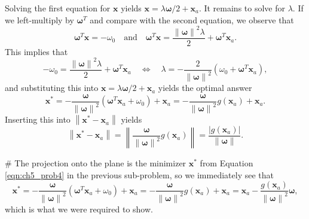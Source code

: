 \documentclass[12pt, a4paper]{article}
\newcommand{\vect}[1]{\bm{#1}}
\newcommand{\norm}[1]{\left\lVert#1\right\rVert}
\newcommand{\abs}[1]{\left\lvert#1\right\rvert}
\begin{document}
\begin{easylist}[enumerate]
	Solving the first equation for $\vect{x}$ yields $\vect{x} = \lambda \vect{\omega} / 2 + \vect{x}_a$.
	It remains to solve for $\lambda$.
	If we left-multiply by $\vect{\omega}^T$ and compare with the second equation, we observe that
	\begin{equation*}
		\vect{\omega}^T \vect{x} 
		= -\omega_0 \quad \text{and} 
		\quad 
		\vect{\omega}^T \vect{x} 
		= 
		\frac{\norm{\vect{\omega}}^2 \lambda}{2} + \vect{\omega}^T \vect{x}_a.
	\end{equation*}
	This implies that
	\begin{equation*}
		-\omega_0 =  \frac{\norm{\vect{\omega}}^2 \lambda}{2} + \vect{\omega}^T \vect{x}_a \quad \Leftrightarrow \quad \lambda = - \frac{2}{\norm{\vect{\omega}}^2}\left( \omega_0 + \vect{\omega}^T \vect{x}_a \right),
	\end{equation*}
	and substituting this into $\vect{x} = \lambda \vect{\omega} / 2 + \vect{x}_a$ yields the optimal answer
	\begin{equation}
	\label{eqn:ch5_prob4}
		\vect{x}^* = -\frac{\vect{\omega}}{\norm{\vect{\omega}}^2} \left( \vect{\omega}^T \vect{x}_a + \omega_0 \right) + \vect{x}_a = - \frac{\vect{\omega}}{\norm{\vect{\omega}}^2} g(\vect{x}_a) + \vect{x}_a.
	\end{equation}
	Inserting this into $\norm{\vect{x}^* - \vect{x}_a}$ yields 
	\begin{equation*}
		\norm{\vect{x}^* - \vect{x}_a}=
		\norm{\frac{\vect{\omega}}{\norm{\vect{\omega}}^2} g(\vect{x}_a)}
		= \frac{\abs{g(\vect{x}_a)}}{\norm{\vect{\omega}}}.
	\end{equation*}
	
	# The projection onto the plane is the minimizer $\vect{x}^*$ from Equation \eqref{eqn:ch5_prob4} in the previous sub-problem, so we immediately see that 
	\begin{equation*}
	\vect{x}^* = -\frac{\vect{\omega}}{\norm{\vect{\omega}}^2} \left( \vect{\omega}^T \vect{x}_a + \omega_0 \right) + \vect{x}_a = - \frac{\vect{\omega}}{\norm{\vect{\omega}}^2} g(\vect{x}_a) + \vect{x}_a
	=  
	\vect{x}_a - \frac{g(\vect{x}_a)}{\norm{\vect{\omega}}^2}  \vect{\omega},
	\end{equation*}
	which is what we were required to show.
\end{easylist}
\end{document}
